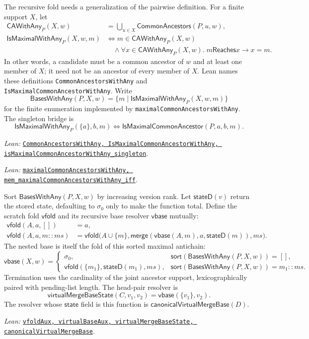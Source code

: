 \documentclass[11pt]{article}
\theoremstyle{definition}
\newcommand{\init}{\sigma_0}
\newcommand{\merge}{\mathsf{merge}}
\newcommand{\reach}{\mathrel{\mathsf{Reaches}}}
\newcommand{\lean}[1]{\texttt{#1}}
\newcommand{\src}[2]{\href{../../#1}{\texttt{#2}}}
\newcommand{\anchor}[2]{\par\smallskip\noindent\emph{Lean: }\src{#1}{#2}.}
\begin{document}
The recursive fold needs a generalization of the pairwise definition. For a
finite support $X$, let
\[
\begin{aligned}
 \mathsf{CAWithAny}_P(X,w)
   &=\bigcup_{u\in X}\mathsf{CommonAncestors}(P,u,w),\\
 \mathsf{IsMaximalWithAny}_P(X,w,m)
   &\Longleftrightarrow
     m\in\mathsf{CAWithAny}_P(X,w)\\
   &\quad\land
     \forall x\in\mathsf{CAWithAny}_P(X,w).\;
       m\reach x\to x=m.
\end{aligned}
\]
In other words, a candidate must be a common ancestor of $w$ and at least one
member of $X$; it need not be an ancestor of every member of $X$. Lean names
these definitions \lean{CommonAncestorsWithAny} and
\lean{IsMaximalCommonAncestorWithAny}. Write
\[
 \mathsf{BasesWithAny}(P,X,w)
 =\{m\mid
   \mathsf{IsMaximalWithAny}_P(X,w,m)\}
\]
for the finite enumeration implemented by
\lean{maximalCommonAncestorsWithAny}. The singleton bridge is
\[
 \mathsf{IsMaximalWithAny}_P(\{a\},b,m)
 \Longleftrightarrow
 \mathsf{IsMaximalCommonAncestor}(P,a,b,m).
\]
\anchor{Sal/MRDTs/Framework/Execution.lean}
  {CommonAncestorsWithAny, IsMaximalCommonAncestorWithAny,
   isMaximalCommonAncestorWithAny\_singleton}
\anchor{Sal/MRDTs/Metatheory/VirtualMergeBase.lean}
  {maximalCommonAncestorsWithAny,
   mem\_maximalCommonAncestorsWithAny\_iff}

Sort $\mathsf{BasesWithAny}(P,X,w)$ by increasing version rank. Let
$\mathsf{stateD}(v)$ return the stored state, defaulting to $\init$ only to
make the function total. Define the scratch fold $\mathsf{vfold}$ and its
recursive base resolver $\mathsf{vbase}$ mutually:
\[
\begin{aligned}
 \mathsf{vfold}(A,a,[])&=a,\\
 \mathsf{vfold}(A,a,m::ms)&=
 \mathsf{vfold}\bigl(A\cup\{m\},
   \merge(\mathsf{vbase}(A,m),a,\mathsf{stateD}(m)),ms\bigr).
\end{aligned}
\]
The nested base is itself the fold of this sorted maximal antichain:
\[
 \mathsf{vbase}(X,w)=
 \begin{cases}
 \init,&\mathsf{sort}(\mathsf{BasesWithAny}(P,X,w))=[],\\
 \mathsf{vfold}(\{m_1\},\mathsf{stateD}(m_1),ms),
   &\mathsf{sort}(\mathsf{BasesWithAny}(P,X,w))=m_1::ms.
 \end{cases}
\]
Termination uses the cardinality of the joint ancestor support,
lexicographically paired with pending-list length. The head-pair resolver is
\[
 \mathsf{virtualMergeBaseState}(C,v_1,v_2)=\mathsf{vbase}(\{v_1\},v_2).
\]
The resolver whose $\mathsf{state}$ field is this function is
$\mathsf{canonicalVirtualMergeBase}(D)$.
\anchor{Sal/MRDTs/Metatheory/VirtualMergeBase.lean}
  {vfoldAux, virtualBaseAux, virtualMergeBaseState, canonicalVirtualMergeBase}
\end{document}
